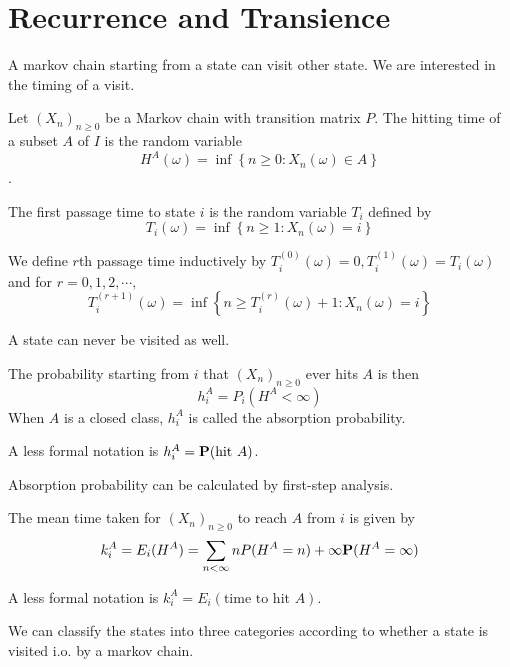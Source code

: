 \section{Recurrence and Transience}
A markov chain starting from a state can visit other state. We are interested in the timing of a visit.

\begin{definition}
    Let $(X_n)_{n\geq 0}$ be a Markov chain with transition matrix $P$. The hitting time of a subset $A$ of $I$ is the random
    variable \[H^A(\omega)=\inf \left\{n\geq 0:X_n(\omega)\in A\right\}\].
\end{definition}
\begin{definition}
    The first passage time to state $i$ is the random variable $T_i$ defined by \[T_i(\omega)=\inf\left\{n\geq 1:X_n(\omega)=i\right\}\]
\end{definition}
\begin{definition}
    We define $r$th passage time inductively by 
    $T_i^{(0)}(\omega)=0,T_i^{(1)}(\omega)=T_i(\omega)$
    and for $r=0,1,2,\cdots,$
    \[T_i^{(r+1)}(\omega)=\inf\left\{n\geq T_i^{(r)}(\omega)+1:X_n(\omega)=i\right\}\]
\end{definition}

A state can never be visited as well.

\begin{definition}
    The probability starting from $i$ that $(X_n)_{n\geq 0}$ ever hits $A$ is then \[h_i^A=P_i(H^A<\infty)\]
    When $A$ is a closed class, $h_i^A$ is called the absorption probability.
\end{definition}
\begin{remark}
A less formal notation is $h_i^A=\mathbf{P}(\text{hit }A)$.
\end{remark}
Absorption probability can be calculated by first-step analysis.
\begin{definition}
    The mean time taken for $(X_n)_{n\geq 0}$ to reach $A$ from $i$ is given by \[k_i^A=E_i(H^A)=\sum_{n<\infty}nP(H^A=n)+\infty \mathbf{P}(H^A=\infty)\]
\end{definition}
\begin{remark}
    A less formal notation is $k_i^A=E_i(\text{time to hit }A)$.
\end{remark}

We can classify the states into three categories according to whether a state is visited i.o. by a markov chain.

